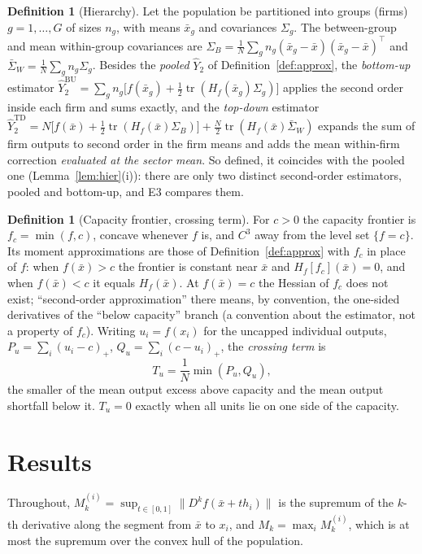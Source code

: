 \documentclass[10pt,a4paper]{article}
\theoremstyle{plain}
\theoremstyle{definition}
\newtheorem{definition}[theorem]{Definition}
\theoremstyle{remark}
\newcommand{\tr}{\operatorname{tr}}
\newcommand{\Yh}{\widehat{Y}}
\newcommand{\Hf}{H_f}
\newcommand{\Tu}{T_u}
\begin{document}
\begin{definition}[Hierarchy]\label{def:hier}
Let the population be partitioned into groups (firms) $g=1,\dots,G$ of sizes $n_g$, with means $\bar x_g$ and covariances $\Sigma_g$. The between-group and mean within-group covariances are $\Sigma_B=\frac1N\sum_g n_g(\bar x_g-\bar x)(\bar x_g-\bar x)^{\!\top}$ and $\bar\Sigma_W=\frac1N\sum_g n_g\Sigma_g$. Besides the \emph{pooled} $\Yh_2$ of Definition~\ref{def:approx}, the \emph{bottom-up} estimator $\Yh_2^{\mathrm{BU}}=\sum_g n_g\big[f(\bar x_g)+\tfrac12\tr(\Hf(\bar x_g)\Sigma_g)\big]$ applies the second order inside each firm and sums exactly, and the \emph{top-down} estimator $\Yh_2^{\mathrm{TD}}=N\big[f(\bar x)+\tfrac12\tr(\Hf(\bar x)\Sigma_B)\big]+\tfrac N2\tr(\Hf(\bar x)\bar\Sigma_W)$ expands the sum of firm outputs to second order in the firm means and adds the mean within-firm correction \emph{evaluated at the sector mean}. So defined, it coincides with the pooled one (Lemma~\ref{lem:hier}(i)): there are only two distinct second-order estimators, pooled and bottom-up, and E3 compares them.
\end{definition}

\begin{definition}[Capacity frontier, crossing term]\label{def:cap}
For $c>0$ the capacity frontier is $f_c=\min(f,c)$, concave whenever $f$ is, and $C^3$ away from the level set $\{f=c\}$. Its moment approximations are those of Definition~\ref{def:approx} with $f_c$ in place of $f$: when $f(\bar x)>c$ the frontier is constant near $\bar x$ and $\Hf[f_c](\bar x)=0$, and when $f(\bar x)<c$ it equals $\Hf(\bar x)$. At $f(\bar x)=c$ the Hessian of $f_c$ does not exist; ``second-order approximation'' there means, by convention, the one-sided derivatives of the ``below capacity'' branch (a convention about the estimator, not a property of $f_c$). Writing $u_i=f(x_i)$ for the uncapped individual outputs, $P_u=\sum_i(u_i-c)_+$, $Q_u=\sum_i(c-u_i)_+$, the \emph{crossing term} is
\[
\Tu=\frac1N\min(P_u,Q_u),
\]
the smaller of the mean output excess above capacity and the mean output shortfall below it. $\Tu=0$ exactly when all units lie on one side of the capacity.
\end{definition}

\section{Results}\label{sec:theory}

Throughout, $M_k^{(i)}=\sup_{t\in[0,1]}\|D^k\!f(\bar x+th_i)\|$ is the supremum of the $k$-th derivative along the segment from $\bar x$ to $x_i$, and $M_k=\max_iM_k^{(i)}$, which is at most the supremum over the convex hull of the population.
\end{document}
